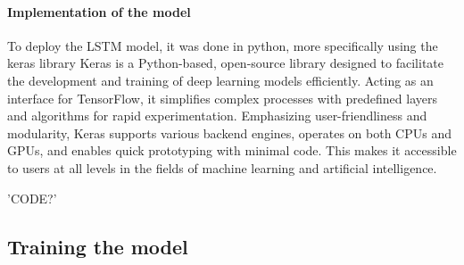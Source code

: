 \paragraph{Implementation of the model}
To deploy the LSTM model, it was done in python, more specifically using the keras library
Keras \cite{chollet2015keras} is a Python-based, open-source library designed to facilitate the development and training of deep learning models efficiently.
Acting as an interface for TensorFlow, it simplifies complex processes with predefined layers and algorithms for rapid experimentation. 
Emphasizing user-friendliness and modularity, Keras supports various backend engines, operates on both CPUs and GPUs, and enables quick prototyping with minimal code. 
This makes it accessible to users at all levels in the fields of machine learning and artificial intelligence.


'CODE?'





\subsection{Training the model}








